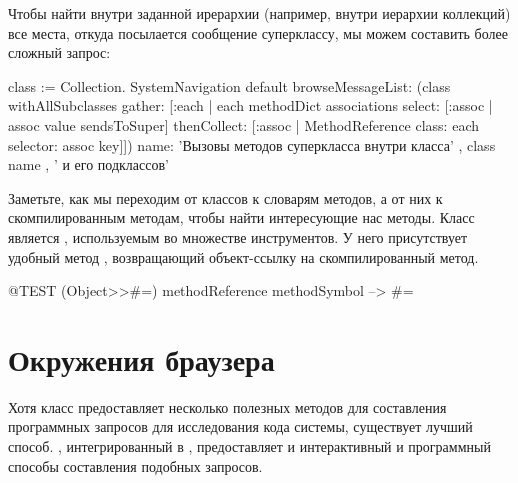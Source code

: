 \documentclass[a4paper,10pt,twoside]{book}
\begin{document}

Чтобы найти внутри заданной ирерархии (например, внутри иерархии коллекций) все места, откуда посылается сообщение суперклассу, мы можем составить более сложный запрос:
\begin{code}{}
class := Collection.
SystemNavigation default
  browseMessageList: (class withAllSubclasses gather: [:each |
    each methodDict associations
      select: [:assoc | assoc value sendsToSuper]
      thenCollect: [:assoc | MethodReference class: each selector: assoc key]])
  name: 'Вызовы методов суперкласса внутри класса' , class name , ' и его подклассов'
\end{code}
Заметьте, как мы переходим от классов к словарям методов, а от них к скомпилированным методам, чтобы найти интересующие нас методы.
Класс  является , используемым во множестве инструментов.
У него присутствует удобный метод , возвращающий объект-ссылку на скомпилированный метод.
\begin{code}{@TEST}
(Object>>#=) methodReference methodSymbol --> #=
\end{code}

\section{Окружения браузера}

Хотя класс  предоставляет несколько полезных методов для составления программных запросов для исследования кода системы, существует лучший способ. , интегрированный в \pharo, предоставляет и интерактивный и программный способы составления подобных запросов.
\end{document}
